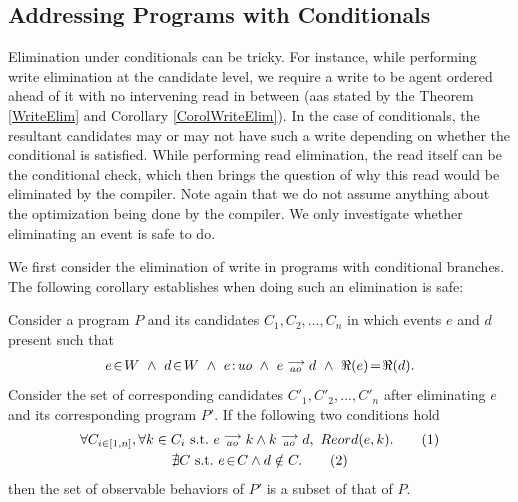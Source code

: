 \subsection{Addressing Programs with Conditionals}
    
    Elimination under conditionals can be tricky. 
    For instance, while performing write elimination at the candidate level, we require a write to be agent ordered ahead of it with no intervening read in between (aas stated by the Theorem \ref{WriteElim} and Corollary \ref{CorolWriteElim}).
    In the case of conditionals, the resultant candidates may or may not have such a write depending on whether the conditional is satisfied. 
    While performing read elimination, the read itself can be the conditional check, which then brings the question of why this read would be eliminated by the compiler.
    Note again that we do not assume anything about the optimization being done by the compiler. 
    We only investigate whether eliminating an event is safe to do.  

    We first consider the elimination of write in programs with conditional branches. 
    The following corollary establishes when doing such an elimination is safe: 
    \begin{corollary}
        \label{WriteElimCond}
        Consider a program $P$ and its candidates $C_1, C_2, ... , C_n$ in which events $e$ and $d$ present such that 
        \begin{align*}
            \event{e}{W} \ \wedge \ \event{d}{W} \ \wedge \ \et{e}{uo} \ \wedge \ \reln{e}{ao}{d} \ \wedge \ \Re(e)\!=\!\Re(d).
        \end{align*} 
        Consider the set of corresponding candidates $C'_1, C'_2, ... , C'_n$ after eliminating $e$ and its corresponding program $P'$. If the following two conditions hold
        \begin{gather}
            \forall C_{i \in [1,n]}, \forall k \in C_i \ \text{s.t.} \ \reln{e}{ao}{k} \wedge \reln{k}{ao}{d}, \    
            Reord(e,k). \tag{1} \label{elim:cond_write1}\\   
            \nexists C \ \text{s.t.} \ \event{e}{C} \wedge d \notin C. \tag{2} \label{elim:cond_write2}
        \end{gather}
        then the set of observable behaviors of $P'$ is a subset of that of $P$.
    \end{corollary}

